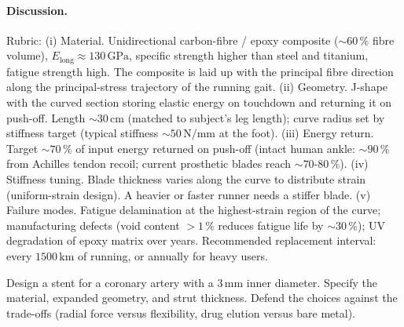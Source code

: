 \paragraph{Discussion.}
Rubric: (i) Material. Unidirectional carbon-fibre / epoxy composite
($\sim 60\,\%$ fibre volume), $E_{\text{long}} \approx 130\,\text{GPa}$,
specific strength higher than steel and titanium, fatigue strength
high. The composite is laid up with the principal fibre direction
along the principal-stress trajectory of the running gait.
(ii) Geometry. J-shape with the curved section storing elastic
energy on touchdown and returning it on push-off. Length
$\sim 30\,\text{cm}$ (matched to subject's leg length); curve radius
set by stiffness target (typical stiffness $\sim 50\,\text{N/mm}$ at
the foot).
(iii) Energy return. Target $\sim 70\,\%$ of input energy returned
on push-off (intact human ankle: $\sim 90\,\%$ from Achilles tendon
recoil; current prosthetic blades reach $\sim 70\text{-}80\,\%$).
(iv) Stiffness tuning. Blade thickness varies along the curve to
distribute strain (uniform-strain design). A heavier or faster runner
needs a stiffer blade.
(v) Failure modes. Fatigue delamination at the highest-strain region
of the curve; manufacturing defects (void content $> 1\,\%$ reduces
fatigue life by $\sim 30\,\%$); UV degradation of epoxy matrix over
years. Recommended replacement interval: every $1500\,\text{km}$ of
running, or annually for heavy users.

\begin{exercise}
Design a stent for a coronary artery with a $3\,\text{mm}$ inner
diameter. Specify the material, expanded geometry, and strut
thickness. Defend the choices against the trade-offs (radial force
versus flexibility, drug elution versus bare metal).
\end{exercise}

